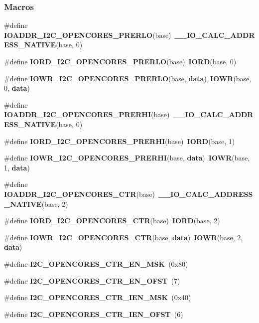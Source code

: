 \subsubsection*{Macros}
\begin{DoxyCompactItemize}
\item 
\#define {\bf I\+O\+A\+D\+D\+R\+\_\+\+I2\+C\+\_\+\+O\+P\+E\+N\+C\+O\+R\+E\+S\+\_\+\+P\+R\+E\+R\+LO}(base)~{\bf \+\_\+\+\_\+\+I\+O\+\_\+\+C\+A\+L\+C\+\_\+\+A\+D\+D\+R\+E\+S\+S\+\_\+\+N\+A\+T\+I\+VE}(base, 0)
\item 
\#define {\bf I\+O\+R\+D\+\_\+\+I2\+C\+\_\+\+O\+P\+E\+N\+C\+O\+R\+E\+S\+\_\+\+P\+R\+E\+R\+LO}(base)~{\bf I\+O\+RD}(base, 0)
\item 
\#define {\bf I\+O\+W\+R\+\_\+\+I2\+C\+\_\+\+O\+P\+E\+N\+C\+O\+R\+E\+S\+\_\+\+P\+R\+E\+R\+LO}(base,  {\bf data})~{\bf I\+O\+WR}(base, 0, {\bf data})
\item 
\#define {\bf I\+O\+A\+D\+D\+R\+\_\+\+I2\+C\+\_\+\+O\+P\+E\+N\+C\+O\+R\+E\+S\+\_\+\+P\+R\+E\+R\+HI}(base)~{\bf \+\_\+\+\_\+\+I\+O\+\_\+\+C\+A\+L\+C\+\_\+\+A\+D\+D\+R\+E\+S\+S\+\_\+\+N\+A\+T\+I\+VE}(base, 0)
\item 
\#define {\bf I\+O\+R\+D\+\_\+\+I2\+C\+\_\+\+O\+P\+E\+N\+C\+O\+R\+E\+S\+\_\+\+P\+R\+E\+R\+HI}(base)~{\bf I\+O\+RD}(base, 1)
\item 
\#define {\bf I\+O\+W\+R\+\_\+\+I2\+C\+\_\+\+O\+P\+E\+N\+C\+O\+R\+E\+S\+\_\+\+P\+R\+E\+R\+HI}(base,  {\bf data})~{\bf I\+O\+WR}(base, 1, {\bf data})
\item 
\#define {\bf I\+O\+A\+D\+D\+R\+\_\+\+I2\+C\+\_\+\+O\+P\+E\+N\+C\+O\+R\+E\+S\+\_\+\+C\+TR}(base)~{\bf \+\_\+\+\_\+\+I\+O\+\_\+\+C\+A\+L\+C\+\_\+\+A\+D\+D\+R\+E\+S\+S\+\_\+\+N\+A\+T\+I\+VE}(base, 2)
\item 
\#define {\bf I\+O\+R\+D\+\_\+\+I2\+C\+\_\+\+O\+P\+E\+N\+C\+O\+R\+E\+S\+\_\+\+C\+TR}(base)~{\bf I\+O\+RD}(base, 2)
\item 
\#define {\bf I\+O\+W\+R\+\_\+\+I2\+C\+\_\+\+O\+P\+E\+N\+C\+O\+R\+E\+S\+\_\+\+C\+TR}(base,  {\bf data})~{\bf I\+O\+WR}(base, 2, {\bf data})
\item 
\#define {\bf I2\+C\+\_\+\+O\+P\+E\+N\+C\+O\+R\+E\+S\+\_\+\+C\+T\+R\+\_\+\+E\+N\+\_\+\+M\+SK}~(0x80)
\item 
\#define {\bf I2\+C\+\_\+\+O\+P\+E\+N\+C\+O\+R\+E\+S\+\_\+\+C\+T\+R\+\_\+\+E\+N\+\_\+\+O\+F\+ST}~(7)
\item 
\#define {\bf I2\+C\+\_\+\+O\+P\+E\+N\+C\+O\+R\+E\+S\+\_\+\+C\+T\+R\+\_\+\+I\+E\+N\+\_\+\+M\+SK}~(0x40)
\item 
\#define {\bf I2\+C\+\_\+\+O\+P\+E\+N\+C\+O\+R\+E\+S\+\_\+\+C\+T\+R\+\_\+\+I\+E\+N\+\_\+\+O\+F\+ST}~(6)

\end{DoxyCompactItemize}
